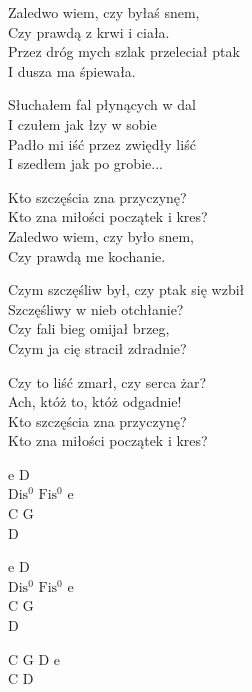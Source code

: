 \begin{text}
    Zaledwo wiem, czy byłaś snem,\\
    Czy prawdą z krwi i ciała.\\
    Przez dróg mych szlak przeleciał ptak\\
    I dusza ma śpiewała.

    Słuchałem fal płynących w dal\\
    I czułem jak łzy w sobie\\
    Padło mi iść przez zwiędły liść\\
    I szedłem jak po grobie...

    Kto szczęścia zna przyczynę?\\
    Kto zna miłości początek i kres?\\
    Zaledwo wiem, czy było snem,\\
    Czy prawdą me kochanie.

    Czym szczęśliw był, czy ptak się wzbił\\
    Szczęśliwy w nieb otchłanie?\\
    Czy fali bieg omijał brzeg,\\
    Czym ja cię stracił zdradnie?

    Czy to liść zmarł, czy serca żar?\\
    Ach, któż to, któż odgadnie!\\
    Kto szczęścia zna przyczynę?\\
    Kto zna miłości początek i kres?
\end{text}
\begin{chord}
    e D\\
    $\mathrm{Dis^{0}}$ $\mathrm{Fis^{0}}$ e\\
    C G\\
    D

    e D\\
    $\mathrm{Dis^{0}}$ $\mathrm{Fis^{0}}$ e\\
    C G\\
    D

    C G D e\\
    C D

    \\
\end{chord}
